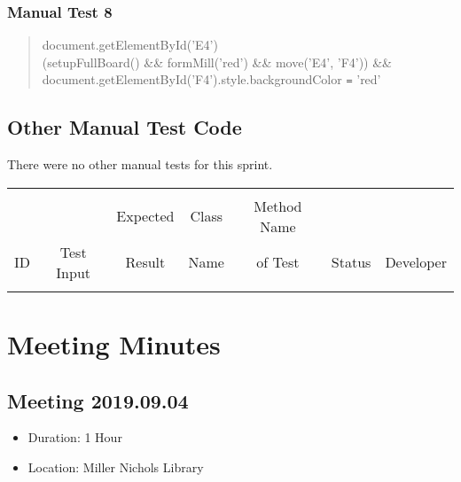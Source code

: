 \documentclass[11pt]{article}
\begin{document}
\subsubsection{Manual Test 8}
\label{sec:org363bf8a}
\begin{verse}
document.getElementById('E4')\\
(setupFullBoard() \&\& formMill('red') \&\& move('E4', 'F4')) \&\& document.getElementById('F4').style.backgroundColor \texttt{=} 'red'\\
\end{verse}

\subsection{Other Manual Test Code}
\label{sec:orga9871c5}

There were no other manual tests for this sprint.

\begin{center}
\begin{tabular}{|c|c|c|c|c|c|c|}
 &  &  &  &  &  & \\
 &  & Expected & Class & Method Name &  & \\
ID & Test Input & Result & Name & of Test & Status & Developer\\
\hline
 &  &  &  &  &  & \\
\end{tabular}
\end{center}

\section{Meeting Minutes}
\label{sec:org6bee0dc}
\subsection{Meeting 2019.09.04}
\label{sec:org5ed2bd0}
\begin{itemize}
\item Duration: 1 Hour
\item Location: Miller Nichols Library
\end{itemize}
\end{document}
